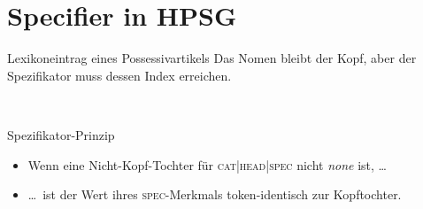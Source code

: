 \section{Specifier in HPSG}

\begin{frame}
  {Lexikoneintrag eines Possessivartikels}
  \onslide<+->
  \onslide<+->
  Das Nomen bleibt der Kopf, aber \alert{der Spezifikator muss dessen Index erreichen}.\\
  \onslide<+->
  \Zeile
  \begin{minipage}{0.45\textwidth}
  \end{minipage}~\onslide<+->%
  \begin{minipage}{0.5\textwidth}
    \alert{Spezifikator-Prinzip}\\
    \Halbzeile 
    \begin{itemize}[<+->]
      \item Wenn eine Nicht-Kopf-Tochter für \textsc{cat|head|spec} nicht \textit{none} ist, \ldots
      \item \ldots\ ist der Wert ihres \textsc{spec}-Merkmals token-identisch zur Kopftochter.\\
    \end{itemize}
  \end{minipage}
\end{frame}

